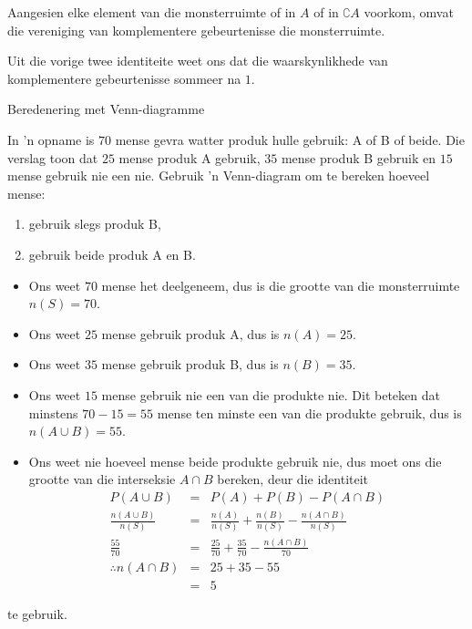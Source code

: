 
Aangesien elke element van die monsterruimte of in $A$ of in $\complement{A}$ voorkom, omvat die vereniging van komplementere gebeurtenisse die monsterruimte.

Uit die vorige twee identiteite weet ons dat die waarskynlikhede van komplementere gebeurtenisse sommeer na $1$.


\begin{wex}{Beredenering met Venn-diagramme}{
  In 'n opname is $70$ mense gevra watter produk hulle gebruik: A of B of beide. Die verslag toon dat $25$ mense produk A gebruik, $35$ mense produk B gebruik en $15$ mense gebruik nie een nie. Gebruik 'n Venn-diagram om te bereken hoeveel mense:
  \begin{enumerate}[itemsep=5pt, label=\textbf{\arabic*}]
  \item gebruik slegs produk B,
  \item gebruik beide produk A en B.
  \end{enumerate}
}{
  \begin{itemize}
  \item Ons weet $70$ mense het deelgeneem, dus is die grootte van die monsterruimte $n(S) = 70$.
  \item Ons weet $25$ mense gebruik produk A, dus is $n(A) = 25$.
  \item Ons weet $35$ mense gebruik produk B, dus is $n(B) = 35$.
  \item Ons weet $15$ mense gebruik nie een van die produkte nie. Dit beteken dat minstens $70-15=55$ mense ten minste een van die produkte gebruik, dus is 
    $n(A \cup B) = 55$.
  \item Ons weet nie hoeveel mense beide produkte gebruik nie, dus moet ons die grootte van die interseksie $A \cap B$ bereken, deur die identiteit
    \begin{eqnarray*}
      P(A \cup B) & = & P(A) + P(B) - P(A \cap B) \\
      \frac{n(A \cup B)}{n(S)} & = & \frac{n(A)}{n(S)} + \frac{n(B)}{n(S)} - \frac{n(A \cap B)}{n(S)} \\
      \frac{55}{70} & = & \frac{25}{70} + \frac{35}{70} - \frac{n(A \cap B)}{70} \\
      \therefore n(A \cap B) & = & 25 + 35 - 55 \\
      & = & 5
    \end{eqnarray*}
  \end{itemize}
te gebruik.

}
\end{wex}
